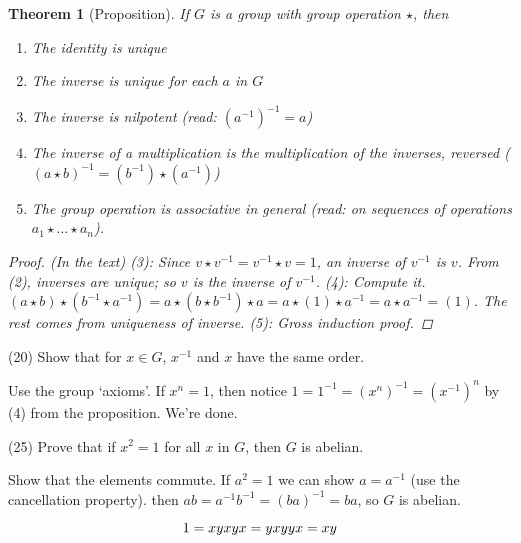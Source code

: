 \documentclass[1    0pt, answers]{exam} \renewcommand{\baselinestretch}{1.05}
\theoremstyle{plain}
\newtheorem{theorem}{Theorem}
\theoremstyle{definition}
\begin{document}
\begin{questions}
\begin{theorem}[Proposition]
If $G$ is a group with group operation $\star$, then
\begin{enumerate}
    \item The identity is unique
    \item The inverse is unique for each $a$ in $G$
    \item The inverse is nilpotent (read: $(a^{-1})^{-1} = a$)
    \item The inverse of a multiplication is the multiplication of the inverses, reversed ( $(a \star b)^{-1} = (b^{-1}) \star (a^{-1})$)
    \item The group operation is associative \emph{in general} (read: on sequences of operations $a_1 \star \ldots \star a_n$).
\end{enumerate}
\begin{proof} (In the text)
(3): Since $v \star v^{-1} = v^{-1} \star v = 1$, an inverse of $v^{-1}$ is $v$. From (2), inverses are unique; so $v$ is \emph{the} inverse of $v^{-1}$.
(4): Compute it. $(a \star b) \star (b^{-1} \star a^{-1}) = a \star (b \star b^{-1}) \star a = a \star (1) \star a^{-1} = a \star a^{-1} = (1)$. The rest comes from uniqueness of inverse.
(5): Gross induction proof.
\end{proof}

\end{theorem}

\question (20) Show that for $x \in G$, $x^{-1}$ and $x$ have the same order.
\begin{solution}
Use the group `axioms'.
If $x^n = 1$, then notice $1 = 1^{-1} = (x^n)^{-1} = (x^{-1})^n$ by (4) from the proposition. We're done.
\end{solution}

\question (25) Prove that if $x^2 = 1$ for all $x$ in $G$, then $G$ is abelian.
\begin{solution}
Show that the elements commute.
If $a^2 = 1$ we can show $a = a^{-1}$ (use the cancellation property).
then $ab = a^{-1}b^{-1} = (ba)^{-1} = ba$, so $G$ is abelian. 
\end{solution}
\begin{solution}
\[
1 = xyxy\\
x = yxy\\
yx = xy
\]
\end{solution}


\end{questions}
\end{document}

